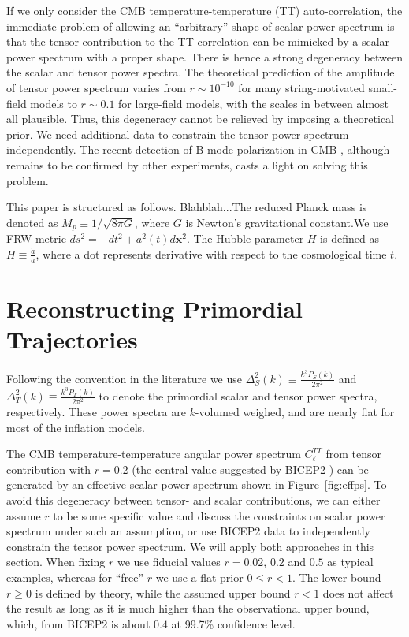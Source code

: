 \documentclass[a4paper,11pt]{article}
\begin{document}
If we only consider the CMB temperature-temperature (TT) auto-correlation, the immediate problem of allowing an ``arbitrary'' shape of scalar power spectrum is that the tensor contribution to the TT correlation can be mimicked by a scalar power spectrum with a proper shape. There is hence a strong degeneracy between the scalar and tensor power spectra. The theoretical prediction of the amplitude of tensor power spectrum varies from $r\sim 10^{-10}$ for many string-motivated small-field models to  $r\sim 0.1$ for large-field models, with the scales in between almost all plausible. Thus, this degeneracy cannot be relieved by imposing a theoretical prior. We need additional data to constrain the tensor power spectrum independently. The recent detection of B-mode polarization in CMB \cite{BICEP2}, although remains to be confirmed by other experiments, casts a light on solving this problem. 

This paper is structured as follows. Blahblah...The reduced Planck mass is denoted as $M_p\equiv 1/\sqrt{8\pi G}$, where $G$ is Newton's gravitational constant.We use FRW metric $ds^2 = -dt^2 + a^2(t) d\mathbf{x}^2$. The Hubble parameter $H$ is defined as $H\equiv \frac{\dot a}{a}$, where a dot represents derivative with respect to the cosmological time $t$.

\section{Reconstructing Primordial Trajectories}

Following the convention in the literature we use $\Delta^2_{S}(k) \equiv \frac{k^3P_S(k)}{2\pi^2}$ and $\Delta^2_T(k) \equiv \frac{k^3P_T(k)}{2\pi^2}$ to denote the primordial scalar and tensor power spectra, respectively. These power spectra are $k$-volumed weighed, and are nearly flat for most of the inflation models.

The CMB temperature-temperature angular power spectrum $C_\ell^{TT}$ from tensor contribution with $r=0.2$ (the central value suggested by BICEP2 \cite{BICEP2}) can be generated by an effective scalar power spectrum shown in Figure~\ref{fig:effps}. To avoid this degeneracy between tensor- and scalar contributions, we can either assume $r$ to be some specific value and discuss the constraints on scalar power spectrum under such an assumption, or use BICEP2 data to independently constrain the tensor power spectrum. We will apply both approaches in this section. When fixing $r$ we use fiducial values $r=0.02$,  $0.2$ and $0.5$ as typical examples, whereas for ``free'' $r$ we use a flat prior $0\le r < 1$. The lower bound $r\ge 0$ is defined by theory, while the assumed upper bound $r<1$ does not affect the result as long as it is much higher than the observational upper bound, which, from BICEP2 is about $0.4$ at 99.7\% confidence level.   
\end{document}
